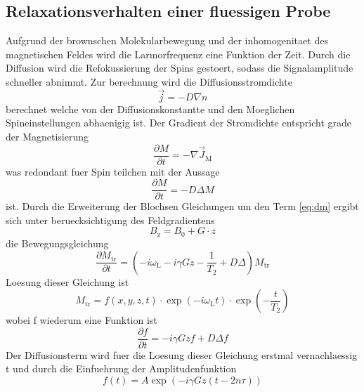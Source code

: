 \subsection{Relaxationsverhalten einer fluessigen Probe}%
\label{sub:relaxationsverhalten_einer_fluessigen_probe}
Aufgrund der brownschen Molekularbewegung und der inhomogenitaet des
magnetischen Feldes wird die Larmorfrequenz eine Funktion der Zeit. 
Durch die Diffusion wird die Refokussierung der Spins gestoert, sodass die
Signalamplitude schneller abnimmt.
Zur berechnung wird die Diffusionsstromdichte 
\begin{equation}
		\vec{j} = -D \nabla n	
\end{equation}
berechnet welche von der Diffusionskonstantte und den Moeglichen
Spineinstellungen abhaenigig ist. 
Der Gradient der Stromdichte entspricht grade der Magnetisierung
\begin{equation}
		\frac{\partial M}{\partial t} = - \nabla \vec{J}_\text{M}
\end{equation}
was redondant fuer Spin  teilchen mit der Aussage 
\begin{equation}
		\label{eq:dm}
		\frac{\partial M}{\partial t} = - D \Delta M
\end{equation}
ist. Durch die Erweiterung der Blochsen Gleichungen um den Term \ref{eq:dm}
ergibt sich unter beruecksichtigung des Feldgradientens
\begin{equation}
		\label{eq:gradB}
		B_\text{z} = B_0 + G \cdot z
\end{equation}
die Bewegungsgleichung
\begin{equation}
		\frac{\partial M_\text{tr}}{\partial t} = \left(- i \omega_\text{L} - i \gamma
Gz - \frac{1}{T_2} + D \Delta \right) M_\text{tr}
\end{equation}
Loesung dieser Gleichung ist 
\begin{equation}
		M_\text{tr} = f(x,y,z,t) \cdot \exp(-i\omega_\text{L}t) \cdot
		\exp\left(-\frac{t}{T_\text{2}}\right)
\end{equation}
wobei f wiederum eine Funktion ist
\begin{equation}
		\frac{\partial f}{\partial t} = -i \gamma Gzf + D \Delta f
\end{equation}
Der Diffusionsterm wird fuer die Loesung dieser Gleichung erstmal vernachlaessig
t und durch die Einfuehrung der Amplitudenfunktion 
\begin{equation}
		f(t) = A \exp \left( -i \gamma Gz ( t -2n\tau) \right)
\end{equation}
